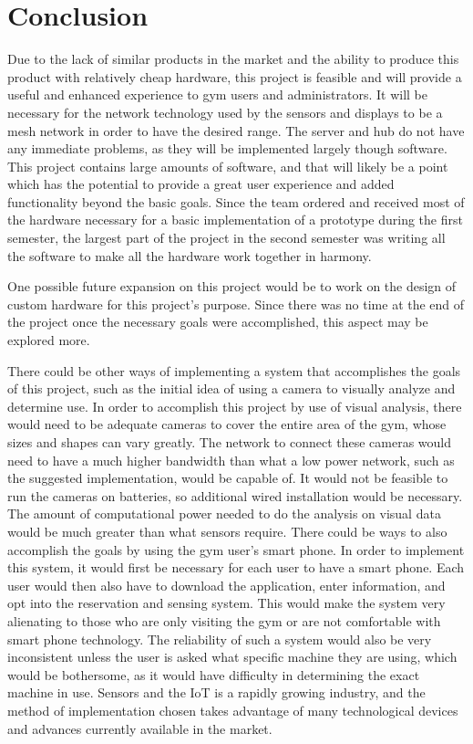 \documentclass[PPFS.tex]{template/subfiles}
\begin{document}
\section{Conclusion}
Due to the lack of similar products in the market and the ability to produce this product with relatively cheap hardware, this project is feasible and will provide a useful and enhanced experience to gym users and administrators. It will be necessary for the network technology used by the sensors and displays to be a mesh network in order to have the desired range. The server and hub do not have any immediate problems, as they will be implemented largely though software. This project contains large amounts of software, and that will likely be a point which has the potential to provide a great user experience and added functionality beyond the basic goals. Since the team ordered and received most of the hardware necessary for a basic implementation of a prototype during the first semester, the largest part of the project in the second semester was writing all the software to make all the hardware work together in harmony.

One possible future expansion on this project would be to work on the design of custom hardware for this project's purpose. Since there was no time at the end of the project once the necessary goals were accomplished, this aspect may be explored more.

There could be other ways of implementing a system that accomplishes the goals of this project, such as the initial idea of using a camera to visually analyze and determine use. In order to accomplish this project by use of visual analysis, there would need to be adequate cameras to cover the entire area of the gym, whose sizes and shapes can vary greatly. The network to connect these cameras would need to have a much higher bandwidth than what a low power network, such as the suggested implementation, would be capable of. It would not be feasible to run the cameras on batteries, so additional wired installation would be necessary. The amount of computational power needed to do the analysis on visual data would be much greater than what sensors require. There could be ways to also accomplish the goals by using the gym user's smart phone. In order to implement this system, it would first be necessary for each user to have a smart phone. Each user would then also have to download the application, enter information, and opt into the reservation and sensing system. This would make the system very alienating to those who are only visiting the gym or are not comfortable with smart phone technology. The reliability of such a system would also be very inconsistent unless the user is asked what specific machine they are using, which would be bothersome, as it would have difficulty in determining the exact machine in use. Sensors and the IoT is a rapidly growing industry, and the method of implementation chosen takes advantage of many technological devices and advances currently available in the market.
\end{document}
